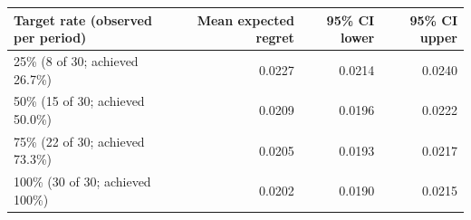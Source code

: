 \begin{tabular}{lrrr}
\toprule
Target rate (observed per period) & Mean expected regret & 95\% CI lower & 95\% CI upper \\
\midrule
25\% (8 of 30; achieved 26.7\%) & 0.0227 & 0.0214 & 0.0240 \\
50\% (15 of 30; achieved 50.0\%) & 0.0209 & 0.0196 & 0.0222 \\
75\% (22 of 30; achieved 73.3\%) & 0.0205 & 0.0193 & 0.0217 \\
100\% (30 of 30; achieved 100\%) & 0.0202 & 0.0190 & 0.0215 \\
\bottomrule
\end{tabular}
